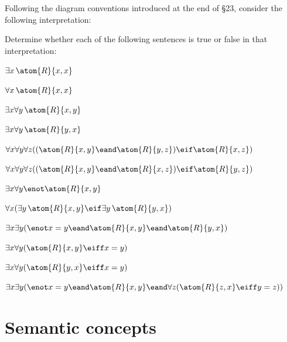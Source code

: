 \problempart
\label{pr.TorF3}
Following the diagram conventions introduced at the end of \S23, consider the following interpretation:	
\begin{center}
\end{center}
Determine whether each of the following sentences is true or false in that interpretation:
\begin{compactlist}
\item $\exists x\,\atom{R}{x,x}$ \hfill {}
\item $\forall x\,\atom{R}{x,x}$ \hfill {}
\item $\exists x \forall y\,\atom{R}{x,y}$ \hfill {}
\item $\exists x \forall y\,\atom{R}{y,x}$ \hfill {}
\item $\forall x \forall y \forall z ((\atom{R}{x,y} \eand \atom{R}{y,z}) \eif \atom{R}{x,z})$ \hfill {}
\item $\forall x \forall y \forall z ((\atom{R}{x,y} \eand \atom{R}{x,z}) \eif \atom{R}{y,z})$ \hfill {}
\item $\exists x \forall y \enot \atom{R}{x,y}$ \hfill {}
\item $\forall x(\exists y\,\atom{R}{x,y} \eif \exists y\,\atom{R}{y,x})$ \hfill {}
\item $\exists x \exists y (\enot x = y \eand \atom{R}{x,y} \eand \atom{R}{y,x})$ \hfill {}
\item $\exists x \forall y(\atom{R}{x,y} \eiff x = y)$ \hfill {}
\item $\exists x \forall y(\atom{R}{y,x} \eiff x = y)$ \hfill {}
\item $\exists x \exists y(\enot x = y \eand \atom{R}{x,y} \eand \forall z(\atom{R}{z,x} \eiff y = z))$ \hfill {}
\end{compactlist}

\chapter{Semantic concepts}
\setcounter{ProbPart}{0}

